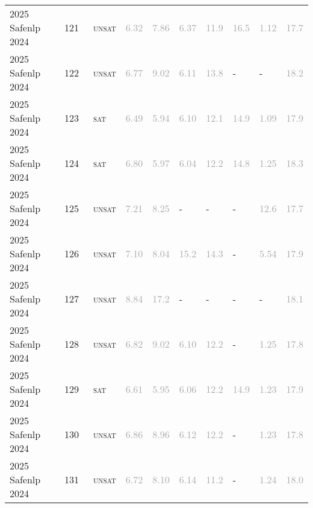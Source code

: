 \begin{center}
{\begin{longtable}{@{}llllllllll@{}}
2025 Safenlp 2024 & 121 & ~\textsc{unsat} & \textcolor{darkgray}{6.32} & \textcolor{darkgray}{7.86} & \textcolor{darkgray}{6.37} & \textcolor{darkgray}{11.9} & \textcolor{darkgray}{16.5} & \textcolor{darkgray}{1.12} & \textcolor{darkgray}{17.7} \\
2025 Safenlp 2024 & 122 & ~\textsc{unsat} & \textcolor{darkgray}{6.77} & \textcolor{darkgray}{9.02} & \textcolor{darkgray}{6.11} & \textcolor{darkgray}{13.8} & - & - & \textcolor{darkgray}{18.2} \\
2025 Safenlp 2024 & 123 & ~\textsc{sat} & \textcolor{darkgray}{6.49} & \textcolor{darkgray}{5.94} & \textcolor{darkgray}{6.10} & \textcolor{darkgray}{12.1} & \textcolor{darkgray}{14.9} & \textcolor{darkgray}{1.09} & \textcolor{darkgray}{17.9} \\
2025 Safenlp 2024 & 124 & ~\textsc{sat} & \textcolor{darkgray}{6.80} & \textcolor{darkgray}{5.97} & \textcolor{darkgray}{6.04} & \textcolor{darkgray}{12.2} & \textcolor{darkgray}{14.8} & \textcolor{darkgray}{1.25} & \textcolor{darkgray}{18.3} \\
2025 Safenlp 2024 & 125 & ~\textsc{unsat} & \textcolor{darkgray}{7.21} & \textcolor{darkgray}{8.25} & - & - & - & \textcolor{darkgray}{12.6} & \textcolor{darkgray}{17.7} \\
2025 Safenlp 2024 & 126 & ~\textsc{unsat} & \textcolor{darkgray}{7.10} & \textcolor{darkgray}{8.04} & \textcolor{darkgray}{15.2} & \textcolor{darkgray}{14.3} & - & \textcolor{darkgray}{5.54} & \textcolor{darkgray}{17.9} \\
2025 Safenlp 2024 & 127 & ~\textsc{unsat} & \textcolor{darkgray}{8.84} & \textcolor{darkgray}{17.2} & - & - & - & - & \textcolor{darkgray}{18.1} \\
2025 Safenlp 2024 & 128 & ~\textsc{unsat} & \textcolor{darkgray}{6.82} & \textcolor{darkgray}{9.02} & \textcolor{darkgray}{6.10} & \textcolor{darkgray}{12.2} & - & \textcolor{darkgray}{1.25} & \textcolor{darkgray}{17.8} \\
2025 Safenlp 2024 & 129 & ~\textsc{sat} & \textcolor{darkgray}{6.61} & \textcolor{darkgray}{5.95} & \textcolor{darkgray}{6.06} & \textcolor{darkgray}{12.2} & \textcolor{darkgray}{14.9} & \textcolor{darkgray}{1.23} & \textcolor{darkgray}{17.9} \\
2025 Safenlp 2024 & 130 & ~\textsc{unsat} & \textcolor{darkgray}{6.86} & \textcolor{darkgray}{8.96} & \textcolor{darkgray}{6.12} & \textcolor{darkgray}{12.2} & - & \textcolor{darkgray}{1.23} & \textcolor{darkgray}{17.8} \\
2025 Safenlp 2024 & 131 & ~\textsc{unsat} & \textcolor{darkgray}{6.72} & \textcolor{darkgray}{8.10} & \textcolor{darkgray}{6.14} & \textcolor{darkgray}{11.2} & - & \textcolor{darkgray}{1.24} & \textcolor{darkgray}{18.0} \\

\end{longtable}}
\end{center}
